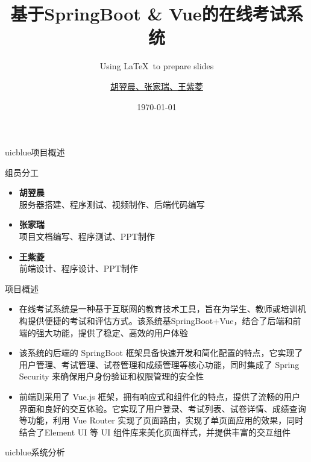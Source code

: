 \documentclass{beamer}
\title{基于SpringBoot \& Vue的在线考试系统}
\subtitle{Using \LaTeX\ to prepare slides}
\author{\href{mailto:umunee2@uic.edu}{胡翌晨、张家瑞、王紫菱}}
\date{\today}
\begin{document}
\maketitle
{} %


\begin{chapter}{uicblue}{项目概述}
\end{chapter}

\begin{frame}[fragile]{组员分工}
\begin{itemize}
    \item \textbf{胡翌晨}\\
    \qquad 服务器搭建、程序测试、视频制作、后端代码编写
    \item \textbf{张家瑞}\\
    \qquad 项目文档编写、程序测试、PPT制作
    \item \textbf{王紫菱}\\
    \qquad 前端设计、程序设计、PPT制作
\end{itemize}
\end{frame}


\begin{frame}[fragile]{项目概述}
\begin{itemize}
    \item 在线考试系统是一种基于互联网的教育技术工具，旨在为学生、教师或培训机构提供便捷的考试和评估方式。该系统基SpringBoot+Vue，结合了后端和前端的强大功能，提供了稳定、高效的用户体验
    \item 该系统的后端的 SpringBoot 框架具备快速开发和简化配置的特点，它实现了用户管理、考试管理、试卷管理和成绩管理等核心功能，同时集成了 Spring Security 来确保用户身份验证和权限管理的安全性
    \item 前端则采用了 Vue.js 框架，拥有响应式和组件化的特点，提供了流畅的用户界面和良好的交互体验。它实现了用户登录、考试列表、试卷详情、成绩查询等功能，利用 Vue Router 实现了页面路由，实现了单页面应用的效果，同时结合了Element UI 等 UI 组件库来美化页面样式，并提供丰富的交互组件
\end{itemize}
\end{frame}

\begin{chapter}{uicblue}{系统分析}
\end{chapter}
\end{document}

